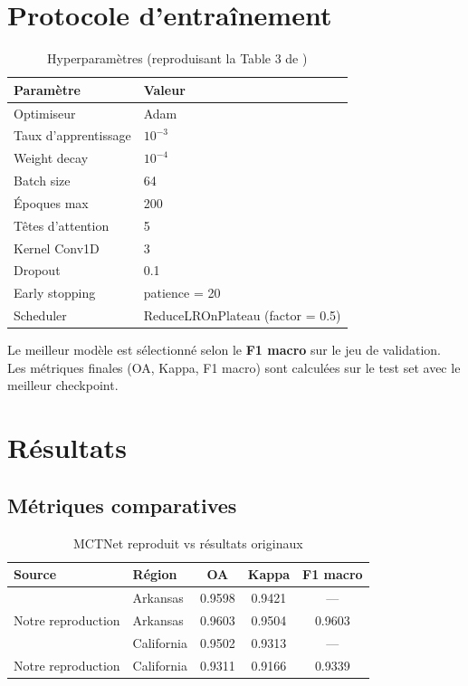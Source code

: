 \section{Protocole d'entraînement}
\label{sec:entrainement}

\begin{table}[H]
\centering
\caption{Hyperparamètres (reproduisant la Table 3 de \cite{wang2024})}
\label{tab:hyperparams}
\begin{tabular}{ll}
\toprule
\textbf{Paramètre}   & \textbf{Valeur} \\
\midrule
Optimiseur           & Adam \\
Taux d'apprentissage & $10^{-3}$ \\
Weight decay         & $10^{-4}$ \\
Batch size           &64 \\
Époques max          & 200 \\
Têtes d'attention    & 5 \\
Kernel Conv1D        & 3 \\
Dropout              & 0.1 \\
Early stopping       & patience = 20 \\
Scheduler            & ReduceLROnPlateau (factor = 0.5) \\
\bottomrule
\end{tabular}
\end{table}

Le meilleur modèle est sélectionné selon le \textbf{F1 macro} sur le jeu de
validation. Les métriques finales (OA, Kappa, F1 macro) sont calculées sur
le test set avec le meilleur checkpoint.

\section{Résultats}
\label{sec:resultats_p1}

\subsection{Métriques comparatives}

\begin{table}[H]
\centering
\caption{MCTNet reproduit vs résultats originaux}
\label{tab:resultats_mctnet}
\begin{tabular}{llccc}
\toprule
\textbf{Source} & \textbf{Région} & \textbf{OA} & \textbf{Kappa} & \textbf{F1 macro} \\
\midrule
\cite{wang2024}    & Arkansas   & 0.9598 & 0.9421 & --- \\
Notre reproduction & Arkansas   & 0.9603 & 0.9504 & 0.9603 \\
\midrule
\cite{wang2024}    & California & 0.9502 & 0.9313 & --- \\
Notre reproduction & California & 0.9311 & 0.9166 & 0.9339 \\
\bottomrule
\end{tabular}
\end{table}

